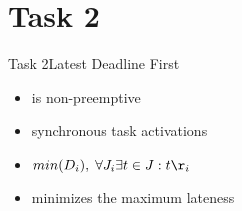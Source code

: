 
\section{Task 2}

\setcounter{task}{1}

\begin{frame}{Task 2}{Latest Deadline First}
  \begin{itemize}
    \item is \alert{non-preemptive}
    \item \alert{synchronous task activations}
    \item $min(D_i),\;\forall J_i\exists t \in J: t\r_i$
    \item \alert{minimizes} the \alert{maximum lateness}
  \end{itemize}
\end{frame}
